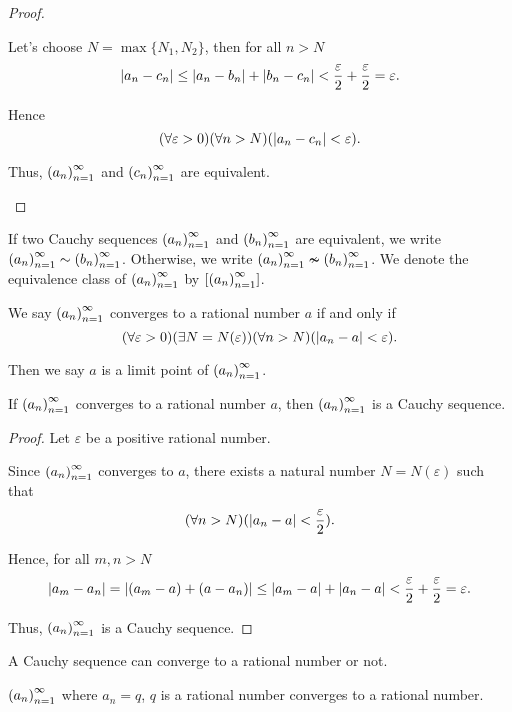\begin{proof}
\begin{itemize}
              Let's choose $N = \max\{ N_{1}, N_{2} \}$, then for all $n > N$
              \[
                  \left\vert{a_{n} - c_{n}}\right\vert \le \left\vert{a_{n} - b_{n}}\right\vert + \left\vert{b_{n} - c_{n}}\right\vert < \frac{\varepsilon}{2} + \frac{\varepsilon}{2} = \varepsilon.
              \]

              Hence
              \[
                  (\forall\varepsilon > 0)(\forall n > N)(\left\vert{a_{n} - c_{n}}\right\vert < \varepsilon).
              \]

              Thus, ${\left({a_{n}}\right)}^{\infty}_{n=1}$ and ${\left({c_{n}}\right)}^{\infty}_{n=1}$ are equivalent.
    \end{itemize}
\end{proof}

If two Cauchy sequences ${\left({a_{n}}\right)}^{\infty}_{n=1}$ and ${\left({b_{n}}\right)}^{\infty}_{n=1}$ are equivalent, we write ${\left({a_{n}}\right)}^{\infty}_{n=1}\sim{\left({b_{n}}\right)}^{\infty}_{n=1}$. Otherwise, we write ${\left({a_{n}}\right)}^{\infty}_{n=1}\nsim{\left({b_{n}}\right)}^{\infty}_{n=1}$. We denote the equivalence class of ${\left({a_{n}}\right)}^{\infty}_{n=1}$ by $\left[{{\left({a_{n}}\right)}^{\infty}_{n=1}}\right]$.

\begin{definition}
    We say ${\left({a_{n}}\right)}^{\infty}_{n=1}$ converges to a rational number $a$ if and only if
    \[
        (\forall\varepsilon > 0)(\exists N=N(\varepsilon))(\forall n > N)(\left\vert{a_{n} - a}\right\vert < \varepsilon).
    \]

    Then we say $a$ is a limit point of ${\left({a_{n}}\right)}^{\infty}_{n=1}$.
\end{definition}

\begin{theorem}
    If ${\left({a_{n}}\right)}^{\infty}_{n=1}$ converges to a rational number $a$, then ${\left({a_{n}}\right)}^{\infty}_{n=1}$ is a Cauchy sequence.
\end{theorem}

\begin{proof}
    Let $\varepsilon$ be a positive rational number.

    Since ${\left({a_{n}}\right)}^{\infty}_{n=1}$ converges to $a$, there exists a natural number $N = N(\varepsilon)$ such that
    \[
        (\forall n > N)(\left\vert{a_{n} - a}\right\vert < \frac{\varepsilon}{2}).
    \]

    Hence, for all $m, n > N$
    \[
        \left\vert{a_{m} - a_{n}}\right\vert = \left\vert{(a_{m} - a) + (a - a_{n})}\right\vert \le \left\vert{a_{m} - a}\right\vert + \left\vert{a_{n} - a}\right\vert < \frac{\varepsilon}{2} + \frac{\varepsilon}{2} = \varepsilon.
    \]

    Thus, ${\left({a_{n}}\right)}^{\infty}_{n=1}$ is a Cauchy sequence.
\end{proof}

A Cauchy sequence can converge to a rational number or not.

\begin{example}
    ${\left({a_{n}}\right)}^{\infty}_{n=1}$ where $a_{n} = q$, $q$ is a rational number converges to a rational number.
\end{example}

